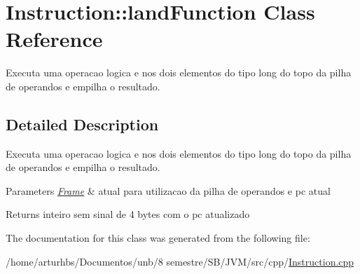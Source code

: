 \hypertarget{classInstruction_1_1landFunction}{}\section{Instruction\+:\+:land\+Function Class Reference}
\label{classInstruction_1_1landFunction}


Executa uma operacao logica \textquotesingle{}e\textquotesingle{} nos dois elementos do tipo long do topo da pilha de operandos e empilha o resultado.  




\subsection{Detailed Description}
Executa uma operacao logica \textquotesingle{}e\textquotesingle{} nos dois elementos do tipo long do topo da pilha de operandos e empilha o resultado. 


\begin{DoxyParams}{Parameters}
{\em \hyperlink{classFrame}{Frame}} & atual para utilizacao da pilha de operandos e pc atual \\
\hline
\end{DoxyParams}
\begin{DoxyReturn}{Returns}
inteiro sem sinal de 4 bytes com o pc atualizado 
\end{DoxyReturn}


The documentation for this class was generated from the following file\+:\begin{DoxyCompactItemize}
\item 
/home/arturhbs/\+Documentos/unb/8 semestre/\+S\+B/\+J\+V\+M/src/cpp/\hyperlink{Instruction_8cpp}{Instruction.\+cpp}\end{DoxyCompactItemize}
